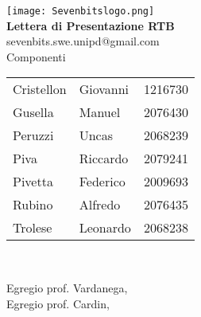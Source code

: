 \documentclass[10pt]{article}
\begin{document}
\begin{titlepage}
    \setcounter{page}{0}
    \centering
    \texttt{[image: Sevenbitslogo.png]} \\[2cm] 
    
     {\fontsize{30}{30}\bfseries Lettera di Presentazione RTB}\selectfont \\[3em]
    {\large sevenbits.swe.unipd@gmail.com} \\[3em]
    
    {\huge Componenti} \\[2.7em]
    {\large 
     \begin{tabular}{l l l}
       Cristellon & Giovanni & 1216730\\
       Gusella & Manuel & 2076430\\
       Peruzzi & Uncas & 2068239\\
       Piva & Riccardo & 2079241\\
       Pivetta & Federico & 2009693\\
       Rubino & Alfredo & 2076435\\
       Trolese & Leonardo & 2068238\\ 
     \end{tabular}
    } \\[3em]
    
    \hfill
      
        
\vfill %
\end{titlepage}
\newpage
\noindent
Egregio prof. Vardanega,\\
Egregio prof. Cardin,\\
\end{document}
